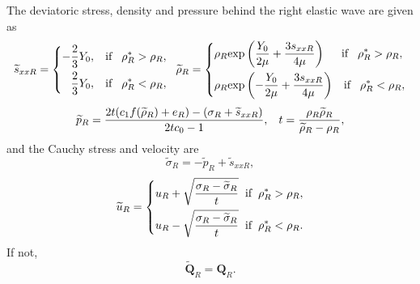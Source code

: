 \documentclass{article}
\numberwithin{equation}{section}
\numberwithin{table}{section}
\begin{document}
\begin{enumerate}
\begin{enumerate}
                           The deviatoric stress, density and pressure  behind the right elastic  wave are given as
\begin{equation*}
  \widetilde{s}_{xxR} =\left\{ \begin{aligned}
	  -\frac{2}{3}Y_0, \hspace{0.3cm} \text{if} \hspace{0.3cm} \rho_R^* > \rho_R,\\
	  \frac{2}{3}Y_0, \hspace{0.3cm} \text{if} \hspace{0.3cm} \rho_R^* < \rho_R,\\
	\end{aligned}\right.
	\hspace{0.2cm} \widetilde{\rho}_{R} = \left\{ \begin{aligned}
	  & \rho_R \text{exp}\left(\frac{Y_0}{2\mu}+\frac{3 s_{xxR}}{4\mu}\right)  \hspace{0.5cm} \text{if} \hspace{0.3cm} \rho_R^* > \rho_R,\\
& \rho_R \text{exp}\left(-\frac{Y_0}{2\mu}+\frac{3 s_{xxR}}{4\mu}\right)
\hspace{0.3cm} \text{if} \hspace{0.3cm} \rho_R^* < \rho_R,\\
  \end{aligned}\right.
 \end{equation*}
\begin{equation*}
  \widetilde{p}_R= \frac{2t(c_1f(\widetilde{\rho}_R)+e_R)-(\sigma_R+\widetilde{s}_{xxR})}{2tc_0-1}, \hspace{0.3cm}
t=\frac{\rho_R \widetilde{\rho}_R}{\widetilde{\rho}_R-\rho_R},
\end{equation*}
and the Cauchy stress and velocity are
\begin{equation*}
\widetilde{\sigma}_R = -\widetilde{p}_R+\widetilde{s}_{xxR},
\end{equation*}
\begin{equation*}
  \widetilde{u}_R= \left\{
  \begin{aligned}
	u_R+\sqrt{\frac{\sigma_R-\widetilde{\sigma}_R}{t}} \hspace{0.2cm} \text{if} \hspace{0.2cm} \rho_R^* >\rho_R,\\
	u_R-\sqrt{\frac{\sigma_R-\widetilde{\sigma}_R}{t}} \hspace{0.2cm} \text{if} \hspace{0.2cm} \rho_R^* <\rho_R.\\
\end{aligned} \right.
\end{equation*}
If not,
\begin{equation*}
  \widetilde{\bm{Q}}_R = \bm{Q}_R.
\end{equation*}


\end{enumerate}
\end{enumerate}
\end{document}

